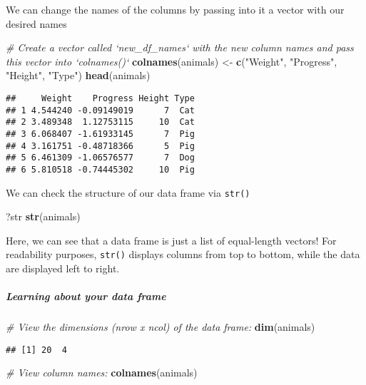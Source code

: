 \documentclass[]{article}
\newenvironment{Shaded}{\begin{snugshade}}{\end{snugshade}}
\newcommand{\KeywordTok}[1]{\textcolor[rgb]{0.13,0.29,0.53}{\textbf{#1}}}
\newcommand{\StringTok}[1]{\textcolor[rgb]{0.31,0.60,0.02}{#1}}
\newcommand{\CommentTok}[1]{\textcolor[rgb]{0.56,0.35,0.01}{\textit{#1}}}
\newcommand{\NormalTok}[1]{#1}
\let\oldsubparagraph\subparagraph
\renewcommand{\subparagraph}[1]{\oldsubparagraph{#1}\mbox{}}
\begin{document}
We can change the names of the columns by passing into it a vector with
our desired names

\begin{Shaded}
\begin{Highlighting}[]
\CommentTok{# Create a vector called `new_df_names` with the new column names and pass this vector into `colnames()`}
\KeywordTok{colnames}\NormalTok{(animals) <-}\StringTok{ }\KeywordTok{c}\NormalTok{(}\StringTok{"Weight"}\NormalTok{, }\StringTok{"Progress"}\NormalTok{, }\StringTok{"Height"}\NormalTok{, }\StringTok{"Type"}\NormalTok{)}
\KeywordTok{head}\NormalTok{(animals)}
\end{Highlighting}
\end{Shaded}

\begin{verbatim}
##     Weight    Progress Height Type
## 1 4.544240 -0.09149019      7  Cat
## 2 3.489348  1.12753115     10  Cat
## 3 6.068407 -1.61933145      7  Pig
## 4 3.161751 -0.48718366      5  Pig
## 5 6.461309 -1.06576577      7  Dog
## 6 5.810518 -0.74445302     10  Pig
\end{verbatim}

We can check the structure of our data frame via \texttt{str()}

\begin{Shaded}
\begin{Highlighting}[]
\NormalTok{?str}
\KeywordTok{str}\NormalTok{(animals)}
\end{Highlighting}
\end{Shaded}

Here, we can see that a data frame is just a list of equal-length
vectors! For readability purposes, \texttt{str()} displays columns from
top to bottom, while the data are displayed left to right.

\subparagraph{Learning about your data
frame}\label{learning-about-your-data-frame}

\begin{Shaded}
\begin{Highlighting}[]
\CommentTok{# View the dimensions (nrow x ncol) of the data frame:}
\KeywordTok{dim}\NormalTok{(animals) }
\end{Highlighting}
\end{Shaded}

\begin{verbatim}
## [1] 20  4
\end{verbatim}

\begin{Shaded}
\begin{Highlighting}[]
\CommentTok{# View column names:}
\KeywordTok{colnames}\NormalTok{(animals)}
\end{Highlighting}
\end{Shaded}
\end{document}

